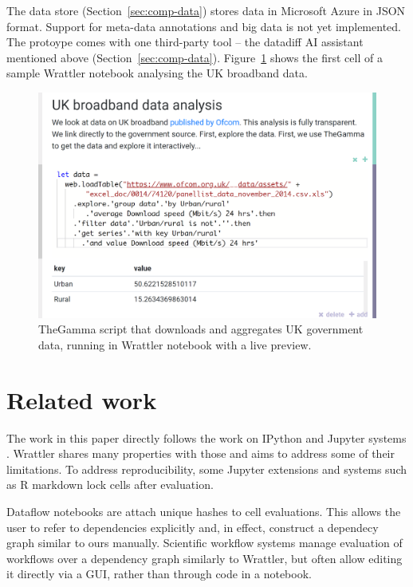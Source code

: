 \documentclass[sigplan]{acmart}\settopmatter{printfolios=true,printccs=false,printacmref=false}
\begin{document}
The data store (Section~\ref{sec:comp-data}) 
stores data in Microsoft Azure in JSON format. Support for meta-data annotations and big data
is not yet implemented. The protoype comes with one third-party tool -- the datadiff AI 
assistant mentioned above (Section~\ref{sec:comp-data}). Figure~\ref{fig:proto} shows the 
first cell of a sample Wrattler notebook analysing the UK broadband data.

\begin{figure}
\vspace{-0.5em}
\includegraphics[scale=0.15]{screen.png}
\caption{\small{TheGamma script that downloads and aggregates UK government data, running in 
  Wrattler notebook with a live preview.}}
\label{fig:proto}
\vspace{-0.5em}
\end{figure}

\section{Related work}

The work in this paper directly follows the work on IPython and Jupyter systems
\cite{ipython,jupyter}. Wrattler shares many properties with those and aims to address some
of their limitations. To address reproducibility, some Jupyter extensions and systems such
as R markdown \cite{rmarkdown} lock cells after evaluation. 

Dataflow notebooks \cite{dataflow} are attach unique hashes to cell 
evaluations. This allows the user to refer to dependencies explicitly and, in effect, construct
a dependecy graph similar to ours manually.
Scientific workflow systems \cite{taverna,kepler} manage evaluation of workflows over a 
dependency graph similarly to Wrattler, but often allow editing it directly via a GUI, rather
than through code in a notebook.
\end{document}

